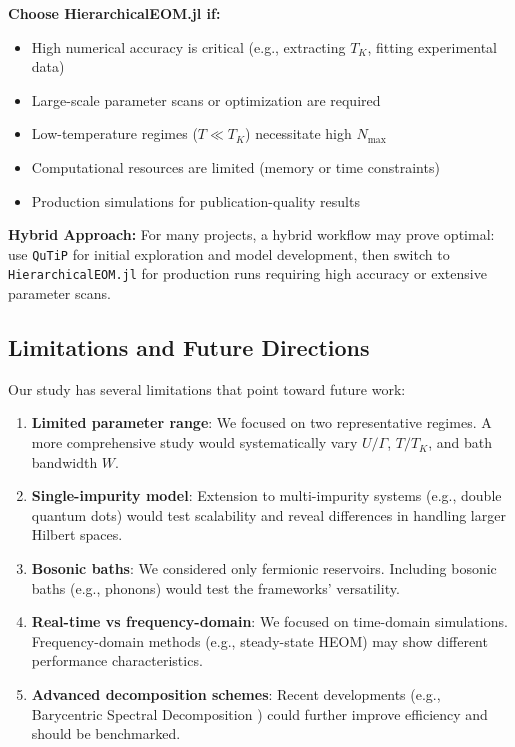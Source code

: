 \documentclass[preprint,1p]{elsarticle}
\begin{document}
\textbf{Choose HierarchicalEOM.jl if:}
\begin{itemize}
    \item High numerical accuracy is critical (e.g., extracting $T_K$, fitting experimental data)
    \item Large-scale parameter scans or optimization are required
    \item Low-temperature regimes ($T \ll T_K$) necessitate high $N_{\text{max}}$
    \item Computational resources are limited (memory or time constraints)
    \item Production simulations for publication-quality results
\end{itemize}

\textbf{Hybrid Approach:}
For many projects, a hybrid workflow may prove optimal: use \texttt{QuTiP} for initial exploration and model development, then switch to \texttt{HierarchicalEOM.jl} for production runs requiring high accuracy or extensive parameter scans.

\subsection{Limitations and Future Directions}

Our study has several limitations that point toward future work:

\begin{enumerate}
    \item \textbf{Limited parameter range}: We focused on two representative regimes. A more comprehensive study would systematically vary $U/\Gamma$, $T/T_K$, and bath bandwidth $W$.
    
    \item \textbf{Single-impurity model}: Extension to multi-impurity systems (e.g., double quantum dots) would test scalability and reveal differences in handling larger Hilbert spaces.
    
    \item \textbf{Bosonic baths}: We considered only fermionic reservoirs. Including bosonic baths (e.g., phonons) would test the frameworks' versatility.
    
    \item \textbf{Real-time vs frequency-domain}: We focused on time-domain simulations. Frequency-domain methods (e.g., steady-state HEOM) may show different performance characteristics.
    
    \item \textbf{Advanced decomposition schemes}: Recent developments (e.g., Barycentric Spectral Decomposition \cite{bai2024barycentric}) could further improve efficiency and should be benchmarked.
\end{enumerate}
\end{document}
